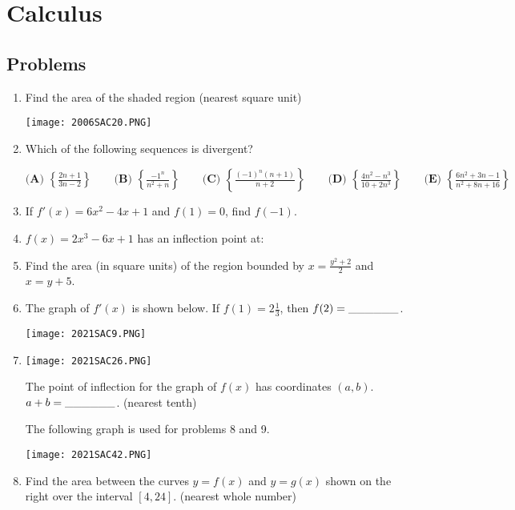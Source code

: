 \documentclass[../uilmath.tex]{subfiles}
\begin{document}
\chapter{Calculus}
\section*{Problems}
\begin{enumerate}[label=\bfseries\arabic*.]
    \item %
    Find the area of the shaded region (nearest square unit)
    \begin{center}
        \texttt{[image: 2006SAC20.PNG]}
    \end{center}

    \item %
    Which of the following sequences is divergent?

    $\textbf{(A) } \left\{\frac{2n+1}{3n-2}\right\}\qquad \textbf{(B) }\left\{\frac{-1^n}{n^2+n}\right\}\qquad \textbf{(C) }\left\{\frac{(-1)^n(n+1)}{n+2}\right\}\qquad \textbf{(D) }\left\{\frac{4n^2-n^3}{10+2n^3}\right\}\qquad \textbf{(E) }\left\{\frac{6n^2+3n-1}{n^2+8n+16}\right\}$

    \item %
    If $f'(x)=6x^2-4x+1$ and $f(1)=0$, find $f(-1)$.

    \item %
    $f(x)=2x^3-6x+1$ has an inflection point at:
    
    \item %
    Find the area (in square units) of the region bounded by $x=\frac{y^2+2}{2}$ and $x=y+5$.

    \item %
    The graph of $f'(x)$ is shown below. If $f(1)=2\frac{1}{3}$, then $f(2)=\_\_\_\_\_\_$.
    \begin{center}
        \texttt{[image: 2021SAC9.PNG]}
    \end{center}
    
    \item %
    \begin{center}
        \texttt{[image: 2021SAC26.PNG]}
    \end{center}

    The point of inflection for the graph of $f(x)$ has coordinates $(a,b)$. $a+b=\_\_\_\_\_\_$. (nearest tenth)


    The following graph is used for problems 8 and 9.
    \begin{center}
        \texttt{[image: 2021SAC42.PNG]}
    \end{center}
    \item %
    Find the area between the curves $y=f(x)$ and $y=g(x)$ shown on the right over the interval $[4,24]$. (nearest whole number)


\end{enumerate}
\end{document}
